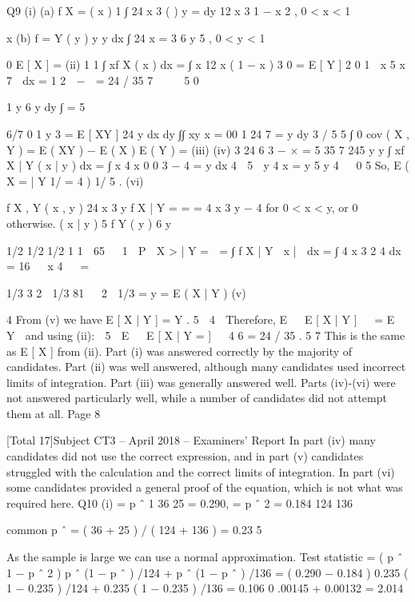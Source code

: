 \documentclass[a4paper,12pt]{article}
\begin{document}
\begin{enumerate}
Q9
(i)
(a)
f X =
( x )
1
∫ 24 x
3
(
)
y =
dy 12 x 3 1 − x 2 ,      0 < x < 1

x
(b)
f =
Y ( y )
y
y dx
∫ 24 x =
3
6 y 5 ,     0 < y < 1

0
E [ X ] =
(ii)
1
1
∫ xf X ( x ) dx = ∫ x 12 x ( 1 − x )
3
0
=
E [ Y ]
2
0
1
 x 5 x 7 
dx =
  1
2  −  = 24 / 35    
7  
  5
0

1
y 6  
y dy
∫ =
5

6/7
0
1 y
3
=
E [ XY ]   24
y   
dx dy
∫∫ xy x =
00
1
24 7
=
y dy 3 / 5
5 ∫
0
cov ( X , Y ) = E ( XY ) − E ( X ) E ( Y ) =
(iii)
(iv)
3 24 6
3
− × =
5 35 7 245
y
y
∫ xf X | Y ( x | y ) dx = ∫ x 4 x
0
0
3 − 4
=
y dx
4  5  y 4
x =
y
5 y 4   0 5
So, E ( X
=
| Y 1/ =
4 ) 1/ 5 .
(vi)

f X , Y ( x , y ) 24 x 3 y
f X | Y =
= =
4 x 3 y − 4 for 0 < x < y, or 0 otherwise.
( x | y )   
5
f Y ( y )
6 y

1/2
1/2
1/2
1
1 
65

 1 
P  X > | Y =  = ∫ f X | Y  x |  dx = ∫ 4 x 3 2 4 dx = 16   x 4   =

1/3
3
2  1/3
81

 2 
1/3
= y =
E ( X | Y
)
(v)



4
From (v) we have E [ X | Y ] =    Y .
5
 4 
Therefore, E   E [ X | Y ]   = E  Y  and using (ii):
 5 
E   E [ X | Y =
]  
4 6
= 24 / 35 .
5 7
This is the same as E [ X ] from (ii).
Part (i) was answered correctly by the majority of candidates. Part (ii)
was well answered, although many candidates used incorrect limits of
integration. Part (iii) was generally answered well. Parts (iv)-(vi) were
not answered particularly well, while a number of candidates did not
attempt them at all.
Page 8

[Total 17]Subject CT3  – April 2018 – Examiners’ Report
In part (iv) many candidates did not use the correct expression, and in
part (v) candidates struggled with the calculation and the correct limits
of integration. In part (vi) some candidates provided a general proof of
the equation, which is not what was required here.
Q10
(i)
=
p ˆ 1
36
25
= 0.290, =
p ˆ 2 = 0.184
124
136

common p ˆ = ( 36 + 25 ) / ( 124 + 136 ) = 0.23 5

As the sample is large we can use a normal approximation.
Test statistic =
( p ˆ 1 − p ˆ 2 )
p ˆ (1 − p ˆ ) /124 + p ˆ (1 − p ˆ ) /136
= ( 0.290 − 0.184 )
0.235 ( 1 − 0.235 ) /124 + 0.235 ( 1 − 0.235 ) /136
= 0.106
0 .00145 + 0.00132
= 2.014


\end{enumerate}
\end{document}
